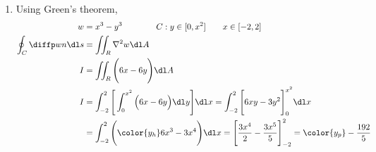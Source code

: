 \begin{enumerate}
    \item Using Green's theorem,
          \begin{align}
              w                       & = x^3 - y^3 \qquad \qquad
              C : y \in [0, x^2] \qquad x \in [-2, 2]                         \\
              \oint_C \diffp wn \dl s & = \iint_R \nabla^2 w \dl A            \\
              I                       & = \iint_R \Bigg( 6x - 6y \Bigg) \dl A \\
              I                       & = \int_{-2}^{2} \Bigg[\int_{0}^{x^2}
                  \Big(  6x - 6y \Big) \dl y\Bigg] \dl x
              =  \int_{-2}^{2}\Bigg[ 6xy - 3y^2 \Bigg]_{0}^{x^2} \dl x        \\
                                      & = \int_{-2}^{2} \Bigg({\color{y_h}
                  6x^3 - 3x^4 } \Bigg) \dl x
              = \Bigg[ \frac{3x^4}{2} - \frac{3x^5}{5} \Bigg]_{-2}^{2}
              = \color{y_p} -\frac{192}{5}
          \end{align}


\end{enumerate}

